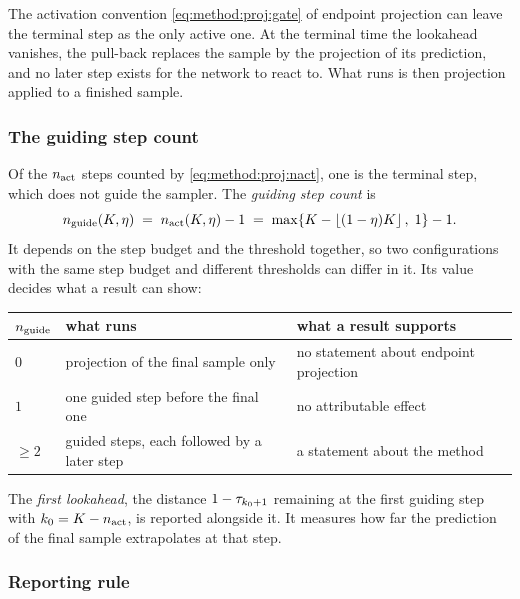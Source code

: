 The activation convention \eqref{eq:method:proj:gate} of endpoint projection can leave the terminal step
as the only active one. At the terminal time the lookahead vanishes, the pull-back replaces the sample
by the projection of its prediction, and no later step exists for the network to react to. What runs is
then projection applied to a finished sample.

\subsubsection*{The guiding step count}

Of the $n_{\textrm{act}}$ steps counted by \eqref{eq:method:proj:nact}, one is the terminal step, which does
not guide the sampler. The \emph{guiding step count} is
\begin{equation}\label{eq:method:degen:ngen}
  n_{\textrm{guide}}(K,\eta)
  \;=\; n_{\textrm{act}}(K,\eta) - 1
  \;=\; \max\!\left\{K - \left\lfloor(1-\eta)K\right\rfloor,\;1\right\} - 1 .
\end{equation}
It depends on the step budget and the threshold together, so two configurations with the same step
budget and different thresholds can differ in it. Its value decides what a result can show:

\begin{center}
\begin{tabularx}{\linewidth}{lLL}
  \toprule
  $n_{\textrm{guide}}$ & what runs & what a result supports \\
  \midrule
  $0$     & projection of the final sample only        & no statement about endpoint projection \\
  $1$     & one guided step before the final one       & no attributable effect \\
  $\ge 2$ & guided steps, each followed by a later step & a statement about the method \\
  \bottomrule
\end{tabularx}
\end{center}

The \emph{first lookahead}, the distance $1-\tau_{k_{0}+1}$ remaining at the first guiding step with
$k_{0} = K - n_{\textrm{act}}$, is reported alongside it. It measures how far the prediction of the final
sample extrapolates at that step.

\subsubsection*{Reporting rule}

